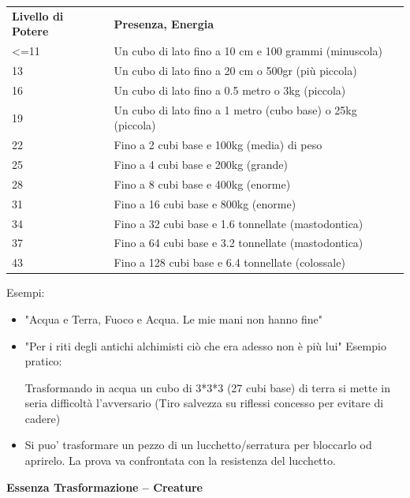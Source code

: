 \documentclass[a4paper,11pt,twoside,openany]{book}
\begin{document}
\bigskip
\begin{tabularx}{0.95\textwidth}{lX}
	\toprule
	\textbf{Livello di Potere} & \textbf{Presenza, Energia}\\
	\textless=11& Un cubo di lato fino a 10 cm e 100 grammi (minuscola)\\
	13& Un cubo di lato fino a 20 cm o 500gr (più piccola)\\
	16& Un cubo di lato fino a 0.5 metro o 3kg (piccola)\\
	19& Un cubo di lato fino a 1 metro (cubo base) o 25kg (piccola)\\
	22& Fino a 2 cubi base e 100kg (media) di peso\\
	25& Fino a 4 cubi base e 200kg (grande)\\
	28& Fino a 8 cubi base e 400kg (enorme)\\
	31& Fino a 16 cubi base e 800kg (enorme)\\
	34& Fino a 32 cubi base e 1.6 tonnellate (mastodontica)\\
	37& Fino a 64 cubi base e 3.2 tonnellate (mastodontica)\\
	43& Fino a 128 cubi base e 6.4 tonnellate (colossale)\\
\end{tabularx}

Esempi:
\begin{itemize}
	\item
	      "Acqua e Terra, Fuoco e Acqua. Le mie mani non hanno fine"
	\item
	      "Per i riti degli antichi alchimisti ciò che era adesso non è più lui"
	      Esempio pratico:

	      Trasformando in acqua un cubo di 3{*}3{*}3 (27 cubi base) di terra si mette in seria difficoltà l'avversario (Tiro salvezza su riflessi concesso per evitare di cadere)
	\item
  Si puo' trasformare un pezzo di un lucchetto/serratura per bloccarlo od aprirelo. La prova va confrontata con la resistenza del lucchetto.      
\end{itemize}

\bigskip

\textbf{Essenza Trasformazione -- Creature}
\end{document}
